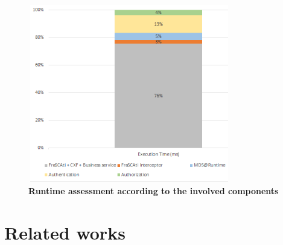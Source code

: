 \documentclass[runningheads,a4paper]{llncs}
\begin{document}
\begin{figure}[ht]  
\centering
\includegraphics[height=220pt, width=250pt]{runtimeAssessment1.PNG}
\caption{\textbf{Runtime assessment according to the involved components
}}
\label{fig:RuntimeAssess}
\end{figure}








\section{Related works}
\end{document}
